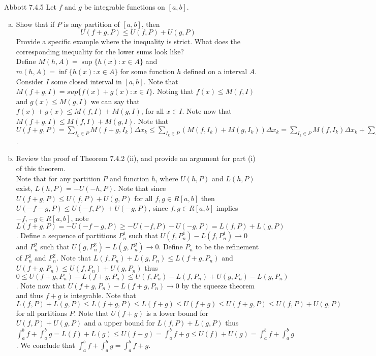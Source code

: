 \documentclass[12pt]{article}
\makeatletter
\theoremstyle{homework}
\newenvironment{exercise}[1]
{\def\@currentlabel{#1}\exercisecore}
{\endexercisecore}
\makeatother
\begin{document}
\begin{exercise}
6
Abbott 7.4.5
\end{exercise}
Let $f$ and $g$ be integrable functions on $[a,b]$.
\begin{enumerate}[(a)] 
\item Show that if $P$ is any partition of $[a,b]$, then $$U(f+g,P) \le U(f,P) + U(g,P)$$
Provide a specific example where the inequality is strict. What does the corresponding inequality for the lower sums look like?\\
Define $M(h,A)=\sup\{h(x) : x \in A \}$ and $m(h,A)=\inf\{h(x) : x \in A \}$ for some function $h$ defined on a interval $A$.  Consider $I$ some closed interval in $[a,b]$.  Note that $M(f+g,I)=sup\{f(x)+g(x) : x \in I \}$.  Noting that $f(x)\leq M(f,I)$ and $g(x)\leq M(g,I)$ we can say that $f(x)+g(x)\leq M(f,I)+M(g,I)$, for all $x\in I$.  Note now that $M(f+g,I)\leq M(f,I)+M(g,I)$.  Note that $U(f+g,P)=\sum_{I_k\in P} M(f+g,I_k)\Delta x_k \le \sum_{I_k\in P} (M(f,I_k)+M(g,I_k))\Delta x_k=\sum_{I_k\in P} M(f,I_k)\Delta x_k+\sum_{I_k\in P} M(g,I_k)\Delta x_k= U(f,P) + U(g,P)$.
\item Review the proof of Theorem 7.4.2 (ii), and provide an argument for part (i) of this theorem.\\
Note that for any partition $P$ and function $h$, where $U(h,P)$ and $L(h,P)$ exist, $L(h,P)=-U(-h,P)$.  Note that since $U(f+g,P) \le U(f,P) + U(g,P)$ for all $f,g\in R[a,b]$ then $U(-f-g,P) \le U(-f,P) + U(-g,P)$, since $f,g\in R[a,b]$ implies $-f,-g\in R[a,b]$, note $L(f+g,P)=-U(-f-g,P) \geq -U(-f,P) - U(-g,P)=L(f,P) +L(g,P)$.  Define a sequence of partitions $P^1_n$ such that $U(f,P^1_n)-L(f,P^1_n)\rightarrow 0$ and $P^2_n$ such that $U(g,P^2_n)-L(g,P^2_n)\rightarrow 0$.  Define $P_n$ to be the refinement of $P^1_n$ and $P^2_n$.  Note that $L(f,P_n) +L(g,P_n) \leq L(f+g,P_n)$ and $ U(f+g,P_n) \leq U(f,P_n) + U(g,P_n)$ thus $0\leq U(f+g,P_n)-L(f+g,P_n) \leq U(f,P_n)-L(f,P_n) + U(g,P_n)-L(g,P_n)$.  Note now that $U(f+g,P_n)-L(f+g,P_n)\rightarrow 0$ by the squeeze theorem and thus $f+g$ is integrable.  Note that $L(f,P) +L(g,P) \leq L(f+g,P)\leq L(f+g)\leq U(f+g) \leq U(f+g,P) \leq U(f,P) + U(g,P)$ for all partitions $P$.  Note that $U(f+g)$ is a lower bound for $U(f,P) + U(g,P)$ and a upper bound for $L(f,P) +L(g,P)$ thus $\int_a^b f+\int_a^b g=L(f) +L(g) \leq U(f+g)=\int_a^b f+g\leq U(f) + U(g)=\int_a^b f+\int_a^b g$.  We conclude that $\int_a^b f+\int_a^b g=\int_a^b f+g$.
\end{enumerate}
\end{document}
